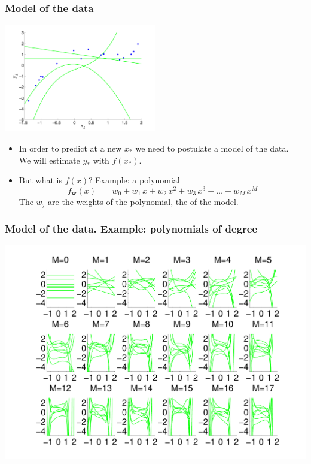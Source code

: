 \begin{frame}
\frametitle{Model of the data}

\centerline{\includegraphics[width=0.5\textwidth]{few_random_polynomials.pdf}}

\vfill

\begin{itemize}
\item In order to predict at a new $x_*$ we need to postulate a model of the data.\\
We will estimate $y_*$ with $f(x_*)$.
\item But what is $f(x)$? Example: a polynomial
%
\[
f_{\bm w}(x)\;=\; w_0 + w_1\,x + w_2\,x^2 + w_3\,x^3 + \ldots + w_M\,x^M
\]
%
The $w_j$ are the weights of the polynomial, the  of the model.
\end{itemize}


\end{frame}
\begin{frame}
\frametitle{Model of the data. Example: polynomials of degree }

\centerline{\includegraphics[width=\textwidth]{random_polynomials.pdf}}

\end{frame}
